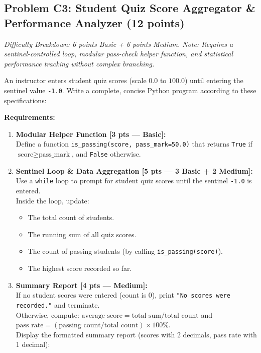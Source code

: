\documentclass[11pt,a4paper]{article}
\begin{document}
\newpage


\subsection*{Problem C3: Student Quiz Score Aggregator \& Performance Analyzer (12 points)}
\textit{Difficulty Breakdown: 6 points Basic + 6 points Medium. Note: Requires a sentinel-controlled loop, modular pass-check helper function, and statistical performance tracking without complex branching.}

An instructor enters student quiz scores (scale $0.0$ to $100.0$) until entering the sentinel value \texttt{-1.0}. Write a complete, concise Python program according to these specifications:

\textbf{Requirements:}
\begin{enumerate}[label=\arabic*.,leftmargin=1.8em,itemsep=0.5pt]
  \item \textbf{Modular Helper Function [3 pts --- Basic]:}\\
    Define a function \texttt{is\_passing(score, pass\_mark=50.0)} that returns \texttt{True} if $\text{score} \ge \text{pass\_mark}$, and \texttt{False} otherwise.
  \item \textbf{Sentinel Loop \& Data Aggregation [5 pts --- 3 Basic + 2 Medium]:}\\
    Use a \texttt{while} loop to prompt for student quiz scores until the sentinel \texttt{-1.0} is entered.\\
    Inside the loop, update:
    \begin{itemize}[itemsep=0.1pt]
      \item The total count of students.
      \item The running sum of all quiz scores.
      \item The count of passing students (by calling \texttt{is\_passing(score)}).
      \item The highest score recorded so far.
    \end{itemize}
  \item \textbf{Summary Report [4 pts --- Medium]:}\\
    If no student scores were entered (count is 0), print \texttt{"No scores were recorded."} and terminate.\\
    Otherwise, compute:
    $\text{average score} = \text{total sum} / \text{total count}$ \quad and \quad
    $\text{pass rate} = (\text{passing count} / \text{total count}) \times 100\%$.\\
    Display the formatted summary report (scores with 2 decimals, pass rate with 1 decimal):
\end{enumerate}
\end{document}
